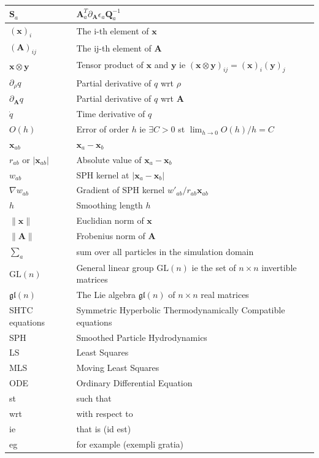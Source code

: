 \documentclass[oneside, a4paper, onecolumn, 11pt]{article}
\renewcommand{\AA}{\mathbf{A}}
\newcommand{\xx}{\mathbf{x}}
\newcommand{\yy}{\mathbf{y}}
\newcommand{\QQ}{\mathbf{Q}}
\renewcommand{\SS}{\mathbf{S}}
\newcommand{\pd}{\partial}
\newcommand{\GL}{\mathrm{GL}(n)}%
\newcommand{\gl}{\mathfrak{gl}(n)}%
\begin{document}
\begin{subsection}
\begin{tabular}{ll}
    $\SS_a$ & $\AA_a^{T} \pd_{\AA} \epsilon_{a} \QQ_a^{-1}$\\
    \midrule
    $(\xx)_i$ & The i-th element of  $\xx$ \\
    $(\AA)_{ij}$ & The ij-th element of  $\AA$ \\
    $\xx \otimes \yy$ & Tensor product of $\xx$ and $\yy$ ie
      $(\xx \otimes \yy)_{ij} = (\xx)_i (\yy)_j$\\
    $\pd_{\rho} q$ & Partial derivative of  $q$ wrt $\rho$\\
    $\pd_{\AA} q$ & Partial derivative of  $q$ wrt $\AA$\\
    $\dot q$ & Time derivative of $q$ \\
    $O(h)$ & Error of order $h$ ie  $\exists C > 0$ st
    $\lim_{h \rightarrow 0} O(h) / h = C$ \\
    $\xx_{ab}$ & $\xx_{a} - \xx_{b}$\\
    $r_{ab}$ or $|\xx_{ab}|$ & Absolute value of $\xx_{a}- \xx_b$\\
    $w_{ab}$ & SPH kernel at $|\mathbf{x}_a - \mathbf{x}_b|$ \\
    $\nabla w_{ab}$ & Gradient of SPH kernel 
     $w'_{ab} / r_{ab} \xx_{ab}$ \\
    $h$ & Smoothing length $h$\\ 
    $\| \xx \|$ & Euclidian norm of $\xx$ \\
    $\| \AA \|$ & Frobenius norm of $\AA$\\
    $\sum_a$ & sum over all particles in the simulation domain\\
    \midrule
    $\GL$ & General linear group $\GL$ ie the set of $n \times n$ invertible matrices\\
    $\gl$ & The Lie algebra $\gl$ of $n \times n$ real matrices\\
    \midrule
    SHTC equations & Symmetric Hyperbolic Thermodynamically
    Compatible equations\\
    SPH & Smoothed Particle Hydrodynamics\\
    LS & Least Squares\\
    MLS & Moving Least Squares\\
    ODE & Ordinary Differential Equation\\
    \midrule
    st & such that\\
    wrt & with respect to\\
    ie & that is (id est)\\
    eg & for example (exempli gratia)\\
    \bottomrule
\end{tabular}
\end{subsection}
\end{document}

